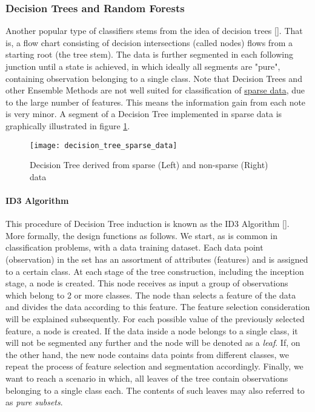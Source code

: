 \subsubsection{Decision Trees and Random Forests}
	Another popular type of classifiers stems from the idea of decision trees [\cite{quinlan2014c4}]. That is, a flow chart consisting of decision intersections (called nodes) flows from a starting root (the tree stem). The data is further segmented in each following junction until a state is achieved, in which ideally all segments are "pure", containing observation belonging to a single class. Note that Decision Trees and other Ensemble Methods are not well suited for classification of \hyperref[data_sparsity]{sparse data}, due to the large number of features. This means the information gain from each note is very minor. A segment of a Decision Tree implemented in sparse data is graphically illustrated in figure \ref{fig:rand_forest_sparse}.
	
	\begin{figure}[h]
		\centering
		\texttt{[image: decision\_tree\_sparse\_data]}
		\captionsetup{width=0.8\textwidth}
		\caption[Decision Tree with Sparse Data]{Decision Tree derived from sparse (Left) and non-sparse (Right) data}
		\label{fig:rand_forest_sparse}
	\end{figure}
		
	\paragraph{ID3 Algorithm} 
		This procedure of Decision Tree induction is known as the ID3 Algorithm [\cite{quinlan1986induction}]. More formally, the design functions as follows. We start, as is common in classification problems, with a data training dataset. Each data point (observation) in the set has an assortment of attributes (features) and is assigned to a certain class. At each stage of the tree construction, including the inception stage, a node is created. This node receives as input a group of observations which belong to 2 or more classes. The node than selects a feature of the data and divides the data according to this feature. The feature selection consideration will be explained subsequently. For each possible value of the previously selected feature, a node is created. If the data inside a node belongs to a single class, it will not be segmented any further and the node will be denoted as a \textit{leaf}. If, on the other hand, the new node contains data points from different classes, we repeat the process of feature selection and segmentation accordingly. Finally, we want to reach a scenario in which, all leaves of the tree contain observations belonging to a single class each. The contents of such leaves may also referred to as \textit{pure subsets}.
		
